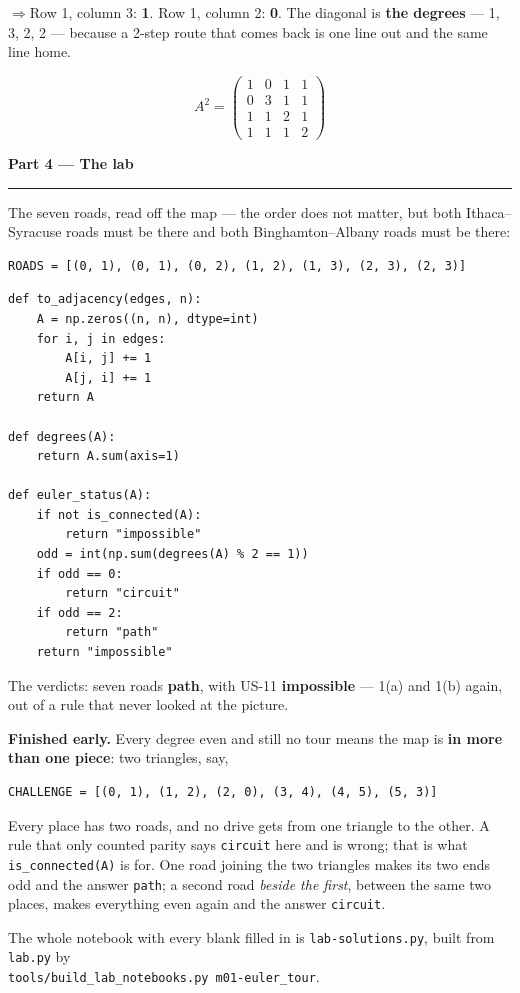 \documentclass[a4paper, 11pt]{extarticle}
\newcommand{\parthead}[2]{%
  \vspace{0.5em}
  {\large\bfseries Part #1 --- #2}\par
  \vspace{-0.4em}\rule{\textwidth}{0.8pt}\par
  \vspace{0.2em}}
\newcommand{\ans}[1]{\textbf{\textcolor{pltblue!75!black}{#1}}}
\newcommand{\arrow}{\textcolor{pltblue!75!black}{$\Rightarrow$}\;}
\begin{document}
\arrow Row 1, column 3: \ans{1}. \quad Row 1, column 2: \ans{0}. \quad The
diagonal is \ans{the degrees} --- 1, 3, 2, 2 --- because a 2-step route that
comes back is one line out and the same line home.

\[
A^2 =
\begin{pmatrix}
1 & 0 & 1 & 1\\
0 & 3 & 1 & 1\\
1 & 1 & 2 & 1\\
1 & 1 & 1 & 2
\end{pmatrix}
\]

\clearpage

\parthead{4}{The lab}

The seven roads, read off the map --- the order does not matter, but both
Ithaca--Syracuse roads must be there and both Binghamton--Albany roads must be
there:

\begin{verbatim}
ROADS = [(0, 1), (0, 1), (0, 2), (1, 2), (1, 3), (2, 3), (2, 3)]
\end{verbatim}

\begin{verbatim}
def to_adjacency(edges, n):
    A = np.zeros((n, n), dtype=int)
    for i, j in edges:
        A[i, j] += 1
        A[j, i] += 1
    return A

def degrees(A):
    return A.sum(axis=1)

def euler_status(A):
    if not is_connected(A):
        return "impossible"
    odd = int(np.sum(degrees(A) % 2 == 1))
    if odd == 0:
        return "circuit"
    if odd == 2:
        return "path"
    return "impossible"
\end{verbatim}

The verdicts: seven roads \ans{path}, with US-11 \ans{impossible} --- 1(a) and
1(b) again, out of a rule that never looked at the picture.

\textbf{Finished early.} Every degree even and still no tour means the map is
\ans{in more than one piece}: two triangles, say,

\begin{verbatim}
CHALLENGE = [(0, 1), (1, 2), (2, 0), (3, 4), (4, 5), (5, 3)]
\end{verbatim}

Every place has two roads, and no drive gets from one triangle to the other. A
rule that only counted parity says \texttt{circuit} here and is wrong; that is
what \texttt{is\_connected(A)} is for. One road joining the two triangles makes
its two ends odd and the answer \texttt{path}; a second road \emph{beside the
first}, between the same two places, makes everything even again and the answer
\texttt{circuit}.

\vspace{0.4em}

{\small The whole notebook with every blank filled in is
\texttt{lab-solutions.py}, built from \texttt{lab.py} by\\
\texttt{tools/build\_lab\_notebooks.py m01-euler\_tour}.}
\end{document}
